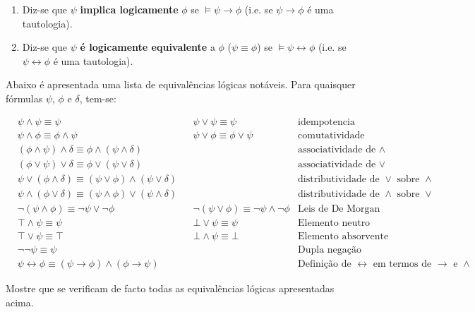 \begin{enumerate}[label=(\alph*)]
    \item Diz-se que $\psi$ \textbf{implica logicamente} $\phi$ se $\models \psi \to \phi$ (i.e. se $\psi \to \phi$ é uma tautologia).
    \item Diz-se que $\psi$ \textbf{é logicamente equivalente} a $\phi$ ($\psi \equiv \phi$) se $\models \psi \leftrightarrow \phi$ (i.e. se $\psi \leftrightarrow \phi$ é uma tautologia).
\end{enumerate}

Abaixo é apresentada uma lista de equivalências lógicas notáveis. Para quaisquer fórmulas $\psi$, $\phi$ e $\delta$, tem-se:

\begin{align*}
    &\psi \land \psi \equiv \psi  && \psi \lor \psi \equiv \psi    &\text{idempotencia} \\
    &\psi \land \phi \equiv \phi \land \psi  &&   \psi \lor \phi \equiv \phi \lor \psi    &\text{comutatividade} \\
    &(\phi \land \psi) \land \delta \equiv \phi \land (\psi \land \delta) && &\text{associatividade de } \land \\
    &(\phi \lor \psi) \lor \delta \equiv \phi \lor (\psi \lor \delta) && &\text{associatividade de } \lor \\
    &\psi \lor (\phi \land \delta) \equiv (\psi \lor \phi) \land (\psi \lor \delta) && & \text{distributividade de } \lor \text{ sobre } \land \\
    &\psi \land (\phi \lor \delta) \equiv (\psi \land \phi) \lor (\psi \land \delta) && &\text{distributividade de } \land \text{ sobre } \lor \\
    &\neg(\psi \land \phi) \equiv \neg\psi \lor \neg\phi && \neg(\psi \lor \phi) \equiv \neg\psi \land \neg\phi & \text{Leis de De Morgan} \\
    &\top \land \psi \equiv \psi && \bot \lor \psi \equiv \psi & \text{Elemento neutro} \\
    &\top \lor \psi \equiv \top && \bot \land \psi \equiv \bot & \text{Elemento absorvente} \\
    &\neg\neg\psi \equiv \psi && &\text{Dupla negação} \\
    &\psi \leftrightarrow \phi \equiv (\psi \to \phi) \land (\phi \to \psi) && &\text{Definição de } \leftrightarrow \text{ em termos de } \rightarrow \text{ e } \land
\end{align*}

\begin{exercises}
    Mostre que se verificam de facto todas as equivalências lógicas apresentadas acima.
\end{exercises}

